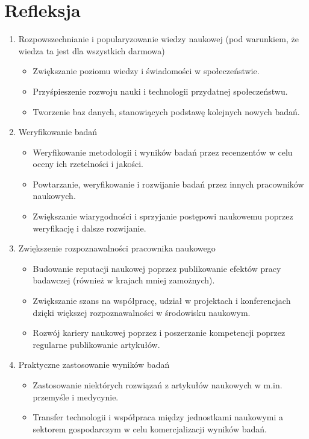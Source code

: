 \section{Refleksja}
\begin{enumerate}
    \item Rozpowszechnianie i popularyzowanie wiedzy naukowej (pod warunkiem, że wiedza ta jest dla wszystkich darmowa)
        \begin{itemize}
            \item Zwiększanie poziomu wiedzy i świadomości w społeczeństwie.
            \item Przyśpieszenie rozwoju nauki i technologii przydatnej społeczeństwu.
            \item Tworzenie baz danych, stanowiących podstawę kolejnych nowych badań.
        \end{itemize}
        \item Weryfikowanie badań
        \begin{itemize}
            \item Weryfikowanie metodologii i wyników badań przez recenzentów w celu oceny ich rzetelności i jakości.
            \item Powtarzanie, weryfikowanie i rozwijanie badań przez innych pracowników naukowych.
            \item Zwiększanie wiarygodności i sprzyjanie postępowi naukowemu poprzez weryfikację i dalsze rozwijanie.
        \end{itemize}
    \item Zwiększenie rozpoznawalności pracownika naukowego
        \begin{itemize}
            \item Budowanie reputacji naukowej poprzez publikowanie efektów pracy badawczej (również w krajach mniej zamożnych).
            \item Zwiększanie szans na współpracę, udział w projektach i konferencjach dzięki większej rozpoznawalności w środowisku naukowym.
            \item Rozwój kariery naukowej poprzez i poszerzanie kompetencji poprzez regularne publikowanie artykułów.
        \end{itemize}
    \item Praktyczne zastosowanie wyników badań
        \begin{itemize}
            \item Zastosowanie niektórych rozwiązań z artykułów naukowych w m.in. przemyśle i medycynie.
            \item Transfer technologii i współpraca między jednostkami naukowymi a sektorem gospodarczym w celu komercjalizacji wyników badań.

\end{itemize}
\end{enumerate}
